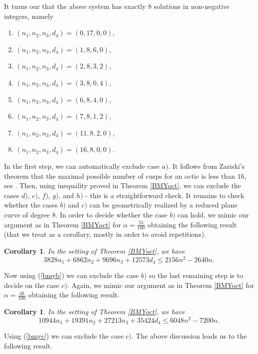 \documentclass[11pt]{amsart}
\theoremstyle{plain}
\newtheorem{corollary}[thm]{Corollary}
\theoremstyle{definition}
\numberwithin{equation}{section}
\begin{document}
It turns our that the above system has exactly $8$ solutions in non-negative integers, namely
\begin{enumerate}
\item[$a)$] $(n_{1},n_{2},n_{3},d_{4})=(0,17,0,0)$,
\item[$b)$] $(n_{1},n_{2},n_{3},d_{4})=(1,8,6,0)$,
\item[$c)$] $(n_{1},n_{2},n_{3},d_{4})=(2,8,3,2)$,
\item[$d)$] $(n_{1},n_{2},n_{3},d_{4})=(3,8,0,4)$,
\item[$e)$] $(n_{1},n_{2},n_{3},d_{4})=(6,8,4,0)$,
\item[$f)$] $(n_{1},n_{2},n_{3},d_{4})=(7,8,1,2)$,
\item[$g)$] $(n_{1},n_{2},n_{3},d_{4})=(11,8,2,0)$,
\item[$h)$] $(n_{1},n_{2},n_{3},d_{4})=(16,8,0,0)$.
\end{enumerate}
In the first step, we can automatically exclude case $a)$. It follows from Zariski's theorem that the maximal possible number of cusps for an octic is less than $16$, see \cite{Zar}. Then, using inequality proved in Theorem \ref{BMYoct}, we can exclude the cases $d)$, $e)$, $f)$, $g)$, and $h)$ - this is a straightforward check. It remains to check whether the cases $b)$ and $c)$ can be geometrically realized by a reduced plane curve of degree $8$. In order to decide whether the case $b)$ can hold, we mimic our argument as in Theorem \ref{BMYoct} for $\alpha=\frac{55}{100}$ obtaining the following result (that we treat as a corollary, mostly in order to avoid repetitions).
\begin{corollary}
In the setting of Theorem \ref{BMYoct}, we have
\begin{equation}
\label{bmyb}
3828n_{1}+6862n_{2}+9696n_{3}+12573d_{4} \leq 2156n^2-2640n.
\end{equation}
\end{corollary}
Now using (\ref{bmyb}) we can exclude the case $b)$ so the last remaining step is to decide on the case $c)$. Again, we mimic our argument as in Theorem \ref{BMYoct} for $\alpha=\frac{48}{100}$ obtaining the following result.
\begin{corollary}
In the setting of Theorem \ref{BMYoct}, we have
\begin{equation}
\label{bmyc}
10944n_{1}+19391n_{2}+27213n_{3}+35424d_{4} \leq 6048n^2-7200n.
\end{equation}
\end{corollary}
Using (\ref{bmyc}) we can exclude the case $c)$. The above discussion leads us to the following result.
\end{document}
